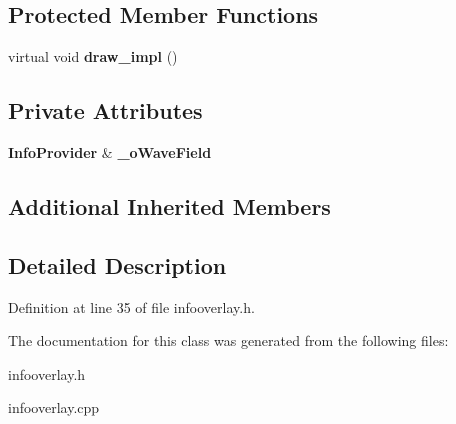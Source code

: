 \subsection*{Protected Member Functions}
\begin{DoxyCompactItemize}
\item 
virtual void {\bfseries draw\-\_\-impl} ()\label{classSoundfieldViewer_1_1InfoOverlay_a8b17bd3b9caa90af105e0bf6c6498653}

\end{DoxyCompactItemize}
\subsection*{Private Attributes}
\begin{DoxyCompactItemize}
\item 
{\bf Info\-Provider} \& {\bfseries \-\_\-o\-Wave\-Field}\label{classSoundfieldViewer_1_1InfoOverlay_a5a56e70fd068b1874387723009e73355}

\end{DoxyCompactItemize}
\subsection*{Additional Inherited Members}


\subsection{Detailed Description}


Definition at line 35 of file infooverlay.\-h.



The documentation for this class was generated from the following files\-:\begin{DoxyCompactItemize}
\item 
infooverlay.\-h\item 
infooverlay.\-cpp\end{DoxyCompactItemize}
